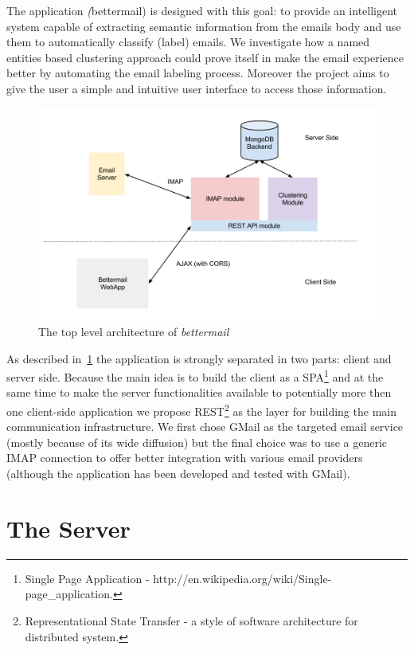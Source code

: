 \documentclass[a4paper,12pt]{report}
\begin{document}
The application \emph(bettermail) is designed with this goal: to provide an intelligent system capable of extracting semantic information from the emails body and use them to automatically classify (label) emails. We investigate how a named entities based clustering approach could prove itself in make the email experience better by automating the email labeling process. Moreover the project aims to give the user a simple and intuitive user interface to access those information.
\begin{figure}[H]
  \centering
  \includegraphics[width=15cm]{Architecture_Overview}
  \caption{The top level architecture of \emph{bettermail}}
  \label{fig:arch}
\end{figure}

As described in~\ref{fig:arch} the application is strongly separated in two parts: client and server side. Because the main idea is to build the client as a SPA\footnote{Single Page Application - http://en.wikipedia.org/wiki/Single-page\_application.} and at the same time to make the server functionalities available to potentially more then one client-side application we propose REST\footnote{Representational State Transfer - a style of software architecture for distributed system.} as the layer for building the main communication infrastructure. 
We first chose GMail as the targeted email service (mostly because of its wide diffusion) but the final choice was to use a generic IMAP connection to offer better integration with various email providers (although the application has been developed and tested with GMail).
\chapter{The Server}
\end{document}
